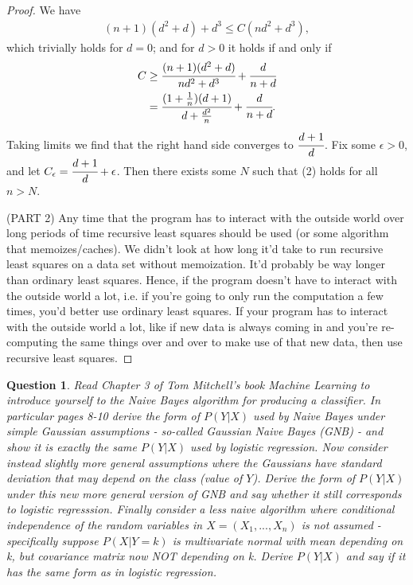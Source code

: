 \documentclass[12pt]{article}
\newtheorem{question}{Question}
\begin{document}
\begin{proof}
We have
\begin{align}
  (n+1)(d^2 + d) + d^3 \leq C(nd^2 + d^3),
\end{align}
which trivially holds for $d=0$; and for $d > 0$ it holds if and only if 
\begin{align*}
  C &\geq \cfrac{(n+1)(d^2+d)}{nd^2+d^3} + \cfrac{d}{n+d} \\
  &= \cfrac{(1+\frac{1}{n})(d+1)}{d+\frac{d^2}{n}} + \cfrac{d}{n+d}.
\end{align*}
Taking limits we find that the right hand side converges to $\cfrac{d+1}{d}$. Fix some $\epsilon>0$, and let $C_{\epsilon} = \cfrac{d+1}{d} + \epsilon$. Then there exists some $N$ such that (2) holds for all $n>N$. \bigbreak

(PART 2) Any time that the program has to interact with the outside world over long periods of time recursive least squares should be used (or some algorithm that memoizes/caches). We didn't look at how long it'd take to run recursive least squares on a data set without memoization. It'd probably be way longer than ordinary least squares. Hence, if the program doesn't have to interact with the outside world a lot, i.e. if you're going to only run the computation a few times, you'd better use ordinary least squares. If your program has to interact with the outside world a lot, like if new data is always coming in and you're re-computing the same things over and over to make use of that new data, then use recursive least squares.

\end{proof}
\begin{question}
  Read Chapter 3 of Tom Mitchell's book Machine Learning to introduce yourself to the Naive Bayes algorithm for producing a classifier. In particular pages 8-10 derive the form of $P(Y|X)$ used by Naive Bayes under simple Gaussian assumptions - so-called Gaussian Naive Bayes (GNB) - and show it is exactly the same $P(Y|X)$ used by logistic regression. Now consider instead slightly more general assumptions where the Gaussians have standard deviation that may depend on the class (value of $Y$). Derive the form of $P(Y|X)$ under this new more general version of GNB and say whether it still corresponds to logistic regresssion. Finally consider a less naive algorithm where conditional independence of the random variables in $X = (X_1, ..., X_n)$ is not assumed - specifically suppose $P(X|Y=k)$ is multivariate normal with mean depending on k, but covariance matrix now NOT depending on k. Derive $P(Y|X)$ and say if it has the same form as in logistic regression.
\end{question}
\end{document}
